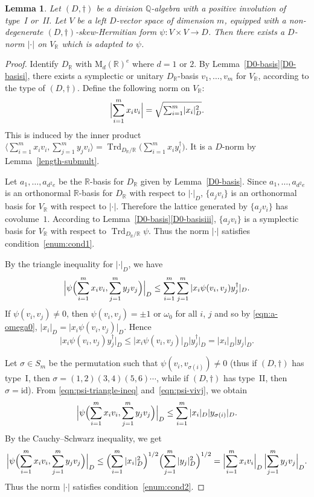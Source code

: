 \documentclass[JEP,XML,SOM,Unicode,NoFloatCountersInSection]{cedram}
\newcommand{\bQ}{\mathbb{Q}}
\newcommand{\bR}{\mathbb{R}}
\newcommand{\rM}{\mathrm{M}}
\DeclareMathOperator{\Trd}{Trd}
\newcommand{\id}{\mathrm{id}}
\newcommand{\abs}[1]{\lvert #1 \rvert}
\newcommand{\Bigabs}[1]{\Bigl\lvert #1 \Bigr\rvert}
\newtheorem{lemma}{Lemma}[section]
\begin{document}
\begin{lemma} \label{good-norm}
Let $(D,\dag)$ be a division $\bQ$-algebra with a positive involution of type~I or~II.
Let $V$ be a left $D$-vector space of dimension $m$, equipped with a non-degenerate $(D,\dag)$-skew-Hermitian form $\psi \colon V \times V \to D$.
Then there exists a $D$-norm $\abs{\cdot}$ on $V_\bR$ which is adapted to $\psi$.
\end{lemma}
\begin{proof}
Identify $D_\bR$ with $\rM_d(\bR)^e$ where $d = 1$ or $2$.
By Lemma~\ref{D0-basis}\eqref{D0-basisi}, there exists a symplectic or unitary $D_\bR$-basis $v_1, \dotsc, v_m$ for $V_\bR$, according to the type of $(D,\dag)$.
Define the following norm on $V_\bR$:
\[
\Bigabs{\sum_{i=1}^m x_i v_i} = \sqrt{\textstyle\sum_{i=1}^m \abs{x_i}_D^2}.
\]
This is induced by the inner product $\bigl\langle \sum_{i=1}^m x_i v_i, \sum_{j=1}^m y_j v_i \bigr\rangle = \Trd_{D_\bR/\bR} \bigl(\sum_{i=1}^m x_i y_i^\dag\bigr)$.
It is a $D$-norm by Lemma~\ref{length-submult}.

Let $a_1, \dotsc, a_{d^2e}$ be the $\bR$-basis for $D_\bR$ given by Lemma~\ref{D0-basis}.
Since $a_1, \dotsc, a_{d^2e}$ is an orthonormal $\bR$-basis for $D_\bR$ with respect to $\abs{\cdot}_D$,
$\{ a_j v_i \}$ is an orthonormal basis for $V_\bR$ with respect to $\abs{\cdot}$.
Therefore the lattice generated by $\{ a_j v_i \}$ has covolume~$1$.
According to Lemma~\ref{D0-basis}\eqref{D0-basisiii}, $\{ a_j v_i \}$ is a symplectic basis for $V_\bR$ with respect to $\Trd_{D_\bR/\bR} \psi$.
Thus the norm $\abs{\cdot}$ satisfies condition~\eqref{enum:cond1}.

By the triangle inequality for $\abs{\cdot}_D$, we have
\begin{equation} \label{eqn:psi-triangle-ineq}
\Bigabs{\psi \Bigl( \sum_{i=1}^m x_i v_i, \sum_{j=1}^m y_j v_j \Bigr)}_D
\leq \sum_{i=1}^m \sum_{j=1}^m\, \abs{x_i \psi(v_i, v_j) y_j^\dag}_D.
\end{equation}
If $\psi(v_i, v_j) \neq 0$, then $\psi(v_i, v_j) = \pm 1$ or $\omega_0$ for all $i$, $j$ and so by \eqref{eqn:a-omega0},
$\abs{x_i}_D = \abs{x_i \psi(v_i, v_j)}_D$. Hence
\begin{equation} \label{eqn:psi-vivj}
\abs{x_i \psi(v_i, v_j) y_j^\dag}_D \leq \abs{x_i \psi(v_i, v_j)}_D \abs{y_j^\dag}_D = \abs{x_i}_D \abs{y_j}_D.
\end{equation}

Let $\sigma \in S_m$ be the permutation such that $\psi(v_i, v_{\sigma(i)}) \neq 0$ (thus if $(D,\dag)$ has type~I, then $\sigma = (1,2)(3,4)(5,6)\dotsm$, while if $(D,\dag)$ has type~II, then $\sigma=\id$).
From \eqref{eqn:psi-triangle-ineq} and~\eqref{eqn:psi-vivj}, we obtain
\[
\Bigabs{\psi \Bigl( \sum_{i=1}^m x_i v_i, \sum_{j=1}^m y_j v_j \Bigr)}_D
\leq \sum_{i=1}^m\, \abs{x_i}_D \abs{y_{\sigma(i)}}_D.
\]
By the Cauchy--Schwarz inequality, we get
\[
\Bigabs{\psi \Bigl( \sum_{i=1}^m x_i v_i, \sum_{j=1}^m y_j v_j \Bigr)}_D
\leq \Bigl( \sum_{i=1}^m\, \abs{x_i}_D^2 \Bigr)^{1/2} \Bigl( \sum_{j=1}^m\, \abs{y_j}_D^2 \Bigr)^{1/2}
= \Bigabs{\sum_{i=1}^m x_iv_i}_D \, \Bigabs{\sum_{j=1}^m y_jv_j}_D.
\]
Thus the norm $\abs{\cdot}$ satisfies condition~\eqref{enum:cond2}.
\end{proof}
\end{document}
